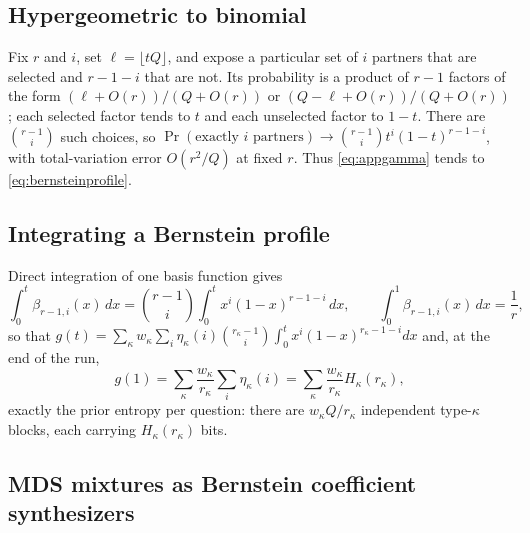 \subsection{Hypergeometric to binomial}

Fix $r$ and $i$, set $\ell = \lfloor tQ\rfloor$, and expose a
particular set of $i$ partners that are selected and $r-1-i$ that are
not. Its probability is a product of $r-1$ factors of the form
$(\ell+O(r))/(Q+O(r))$ or $(Q-\ell+O(r))/(Q+O(r))$; each selected
factor tends to $t$ and each unselected factor to $1-t$. There are
$\binom{r-1}{i}$ such choices, so
$\Pr(\text{exactly } i \text{ partners})\to
\binom{r-1}{i}t^i(1-t)^{r-1-i}$, with total-variation error
$O(r^2/Q)$ at fixed $r$. Thus \eqref{eq:appgamma} tends to
\eqref{eq:bernsteinprofile}.

\subsection{Integrating a Bernstein profile}

Direct integration of one basis function gives
%
\begin{equation}
  \int_0^t\beta_{r-1,i}(x)\,dx
  = \binom{r-1}{i}\int_0^t x^i(1-x)^{r-1-i}\,dx,
  \qquad
  \int_0^1\beta_{r-1,i}(x)\,dx = \frac1r,
  \label{eq:appbetaint}
\end{equation}
%
so that
$g(t) = \sum_\kappa w_\kappa\sum_i\eta_\kappa(i)\binom{r_\kappa-1}{i}
\int_0^t x^i(1-x)^{r_\kappa-1-i}dx$ and, at the end of the run,
%
\begin{equation}
  g(1)
  = \sum_\kappa\frac{w_\kappa}{r_\kappa}\sum_i\eta_\kappa(i)
  = \sum_\kappa\frac{w_\kappa}{r_\kappa}H_\kappa(r_\kappa),
  \label{eq:appgone}
\end{equation}
%
exactly the prior entropy per question: there are
$w_\kappa Q/r_\kappa$ independent type-$\kappa$ blocks, each carrying
$H_\kappa(r_\kappa)$ bits.

\subsection{MDS mixtures as Bernstein coefficient synthesizers}

